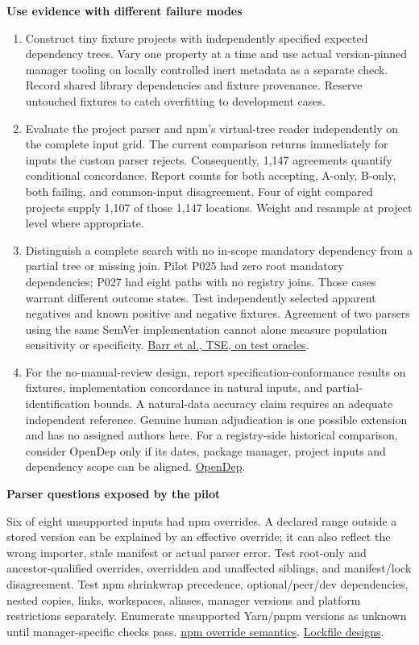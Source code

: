 \documentclass[11pt,a4paper]{article}
\newcommand{\hd}[1]{\par\textbf{\color{accent}#1}\par\nopagebreak}
\newcommand{\doi}[2]{\href{https://doi.org/#1}{#2}}
\begin{document}
\hd{Use evidence with different failure modes}
\begin{enumerate}
\item Construct tiny fixture projects with independently specified expected dependency trees. Vary one property at a time and use actual version-pinned manager tooling on locally controlled inert metadata as a separate check. Record shared library dependencies and fixture provenance. Reserve untouched fixtures to catch overfitting to development cases.
\item Evaluate the project parser and npm's virtual-tree reader independently on the complete input grid. The current comparison returns immediately for inputs the custom parser rejects. Consequently, 1,147 agreements quantify conditional concordance. Report counts for both accepting, A-only, B-only, both failing, and common-input disagreement. Four of eight compared projects supply 1,107 of those 1,147 locations. Weight and resample at project level where appropriate.
\item Distinguish a complete search with no in-scope mandatory dependency from a partial tree or missing join. Pilot P025 had zero root mandatory dependencies; P027 had eight paths with no registry joins. Those cases warrant different outcome states. Test independently selected apparent negatives and known positive and negative fixtures. Agreement of two parsers using the same SemVer implementation cannot alone measure population sensitivity or specificity. \href{https://ieeexplore.ieee.org/document/6963470}{Barr et al., TSE, on test oracles}.
\item For the no-manual-review design, report specification-conformance results on fixtures, implementation concordance in natural inputs, and partial-identification bounds. A natural-data accuracy claim requires an adequate independent reference. Genuine human adjudication is one possible extension and has no assigned authors here. For a registry-side historical comparison, consider OpenDep only if its dates, package manager, project inputs and dependency scope can be aligned. \doi{10.1109/TSE.2026.3717842}{OpenDep}.
\end{enumerate}
\hd{Parser questions exposed by the pilot}
Six of eight unsupported inputs had npm overrides. A declared range outside a stored version can be explained by an effective override; it can also reflect the wrong importer, stale manifest or actual parser error. Test root-only and ancestor-qualified overrides, overridden and unaffected siblings, and manifest/lock disagreement. Test npm shrinkwrap precedence, optional/peer/dev dependencies, nested copies, links, workspaces, aliases, manager versions and platform restrictions separately. Enumerate unsupported Yarn/pnpm versions as unknown until manager-specific checks pass. \href{https://docs.npmjs.com/cli/v11/configuring-npm/package-json/#overrides}{npm override semantics}. \doi{10.1007/s10664-025-10789-w}{Lockfile designs}.
\end{document}
